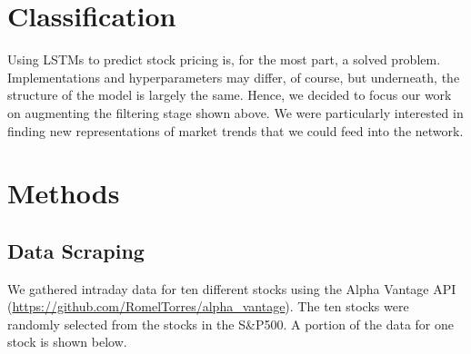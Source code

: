 \documentclass[final]{article}
\begin{document}




\section{Classification}
Using LSTMs to predict stock pricing is, for the most part, a solved
problem. Implementations and hyperparameters may differ, of course,
but underneath, the structure of the model is largely the same. Hence,
we decided to focus our work on augmenting the filtering stage shown
above. We were particularly interested in finding new representations
of market trends that we could feed into the network.

\section{Methods}

\subsection{Data Scraping}
We gathered intraday data for ten different stocks using the Alpha Vantage API
(\url{https://github.com/RomelTorres/alpha_vantage}). The ten stocks were
randomly selected from the stocks in the S\&P500. A portion of the data for one
stock is shown below.
\end{document}
